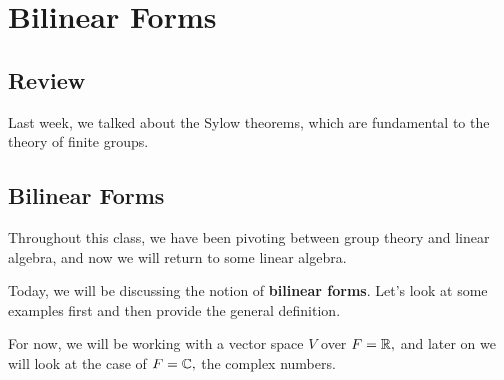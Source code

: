 
\section{Bilinear Forms}

\subsection{Review}
Last week, we talked about the Sylow theorems, which are fundamental to the theory of finite groups. 

\subsection{Bilinear Forms}
Throughout this class, we have been pivoting between group theory and linear algebra, and now we will return to some linear algebra.

Today, we will be discussing the notion of \textbf{bilinear forms}. Let's look at some examples first and then provide the general definition. 

For now, we will be working with a vector space $V$ over $F= \mathbb R,$ and later on we will look at the case of $F = \mathbb C,$ the complex numbers.

